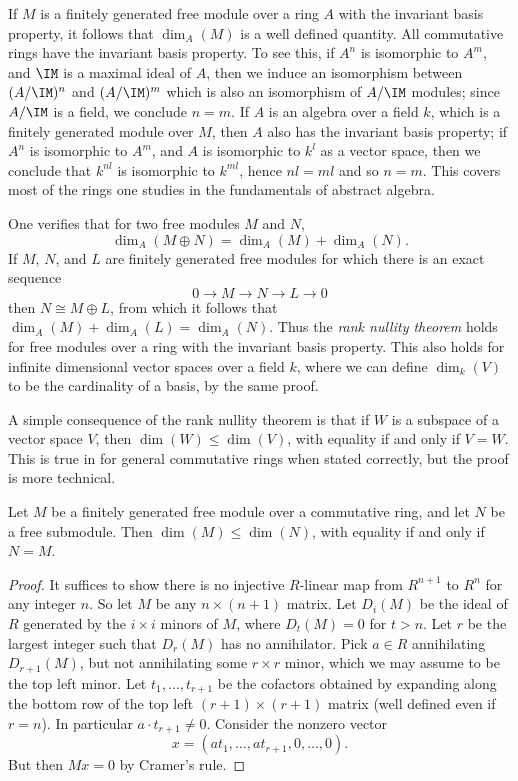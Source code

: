 If $M$ is a finitely generated free module over a ring $A$ with the invariant basis property, it follows that $\dim_A(M)$ is a well defined quantity. All commutative rings have the invariant basis property. To see this, if $A^n$ is isomorphic to $A^m$, and $\IM$ is a maximal ideal of $A$, then we induce an isomorphism between $(A/\IM)^n$ and $(A/\IM)^m$ which is also an isomorphism of $A/\IM$ modules; since $A/\IM$ is a field, we conclude $n = m$. If $A$ is an algebra over a field $k$, which is a finitely generated module over $M$, then $A$ also has the invariant basis property; if $A^n$ is isomorphic to $A^m$, and $A$ is isomorphic to $k^l$ as a vector space, then we conclude that $k^{nl}$ is isomorphic to $k^{ml}$, hence $nl = ml$ and so $n = m$. This covers most of the rings one studies in the fundamentals of abstract algebra.

One verifies that for two free modules $M$ and $N$,
%
\[ \dim_A(M \oplus N) = \dim_A(M) + \dim_A(N). \]
%
If $M$, $N$, and $L$ are finitely generated free modules for which there is an exact sequence
%
\[ 0 \to M \to N \to L \to 0 \]
%
then $N \cong M \oplus L$, from which it follows that $\dim_A(M) + \dim_A(L) = \dim_A(N)$. Thus the \emph{rank nullity theorem} holds for free modules over a ring with the invariant basis property. This also holds for infinite dimensional vector spaces over a field $k$, where we can define $\dim_k(V)$ to be the cardinality of a basis, by the same proof.

A simple consequence of the rank nullity theorem is that if $W$ is a subspace of a vector space $V$, then $\dim(W) \leq \dim(V)$, with equality if and only if $V = W$. This is true in for general commutative rings when stated correctly, but the proof is more technical.

\begin{lemma}
    Let $M$ be a finitely generated free module over a commutative ring, and let $N$ be a free submodule. Then $\dim(M) \leq \dim(N)$, with equality if and only if $N = M$.
\end{lemma}
\begin{proof}
    It suffices to show there is no injective $R$-linear map from $R^{n+1}$ to $R^n$ for any integer $n$. So let $M$ be any $n \times (n+1)$ matrix. Let $D_i(M)$ be the ideal of $R$ generated by the $i \times i$ minors of $M$, where $D_t(M) = 0$ for $t > n$. Let $r$ be the largest integer such that $D_r(M)$ has no annihilator. Pick $a \in R$ annihilating $D_{r+1}(M)$, but not annihilating some $r \times r$ minor, which we may assume to be the top left minor. Let $t_1, \dots, t_{r+1}$ be the cofactors obtained by expanding along the bottom row of the top left $(r+1) \times (r+1)$ matrix (well defined even if $r = n$). In particular $a \cdot t_{r+1} \neq 0$. Consider the nonzero vector
    \[ x = (at_1, \dots, at_{r+1}, 0, \dots, 0). \]
    But then $Mx = 0$ by Cramer's rule.
\end{proof}

